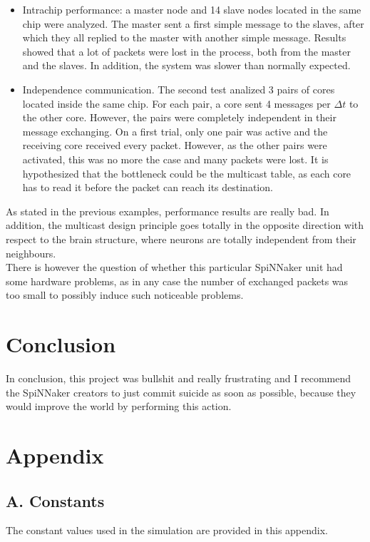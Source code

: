 \documentclass{article}
\begin{document}
\begin{itemize}
\item Intrachip performance: a master node and 14 slave nodes located in the same chip were analyzed. The master sent a first simple message to the slaves, after which they all replied to the master with another simple message. Results showed that a lot of packets were lost in the process, both from the master and the slaves. In addition, the system was slower than normally expected.

\item Independence communication. The second test analized 3 pairs of cores located inside the same chip. For each pair, a core sent 4 messages per \(\Delta t\) to the other core. However, the pairs were completely independent in their message exchanging. On a first trial, only one pair was active and the receiving core received every packet. However, as the other pairs were activated, this was no more the case and many packets were lost. It is hypothesized that the bottleneck could be the multicast table, as each core has to read it before the packet can reach its destination.
\end{itemize}

As stated in the previous examples, performance results are really bad. In addition, the multicast design principle goes totally in the opposite direction with respect to the brain structure, where neurons are totally independent from their neighbours. \\
There is however the question of whether this particular SpiNNaker unit had some hardware problems, as in any case the number of exchanged packets was too small to possibly induce such noticeable problems.


\section{Conclusion}
In conclusion, this project was bullshit and really frustrating and I recommend the SpiNNaker creators to just commit suicide as soon as possible, because they would improve the world by performing this action.



\section{Appendix}
\subsection*{A. Constants}
The constant values used in the simulation are provided in this appendix.
\end{document}
